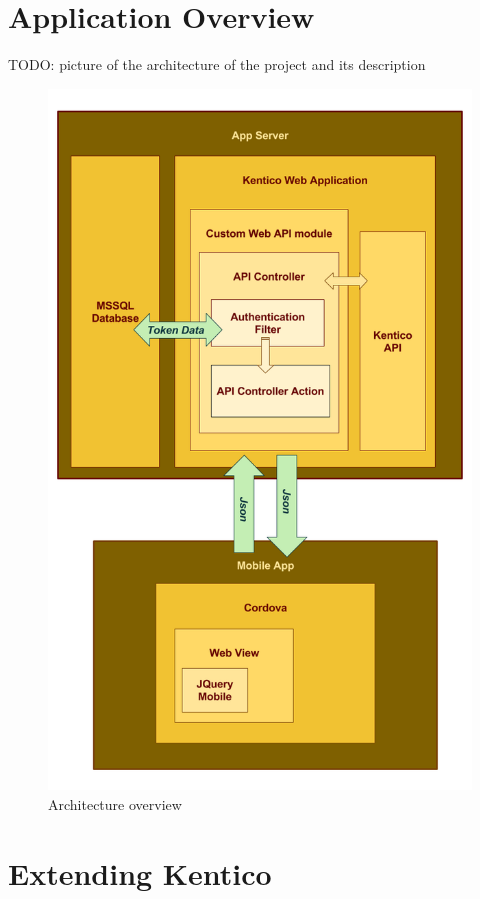 \section{Application Overview}
TODO: picture of the architecture of the project and its description
\begin{figure}[ht!]
  \centering
  \includegraphics[width=\textwidth]{Images/Architecture.png}
  \caption{Architecture overview}
  \label{architectureOverview}
\end{figure}


\section{Extending Kentico} \label{implExtendingKentico}
